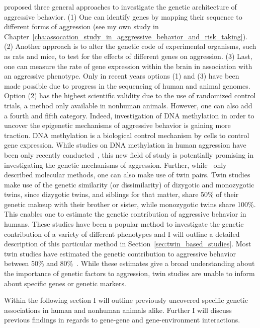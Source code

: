 \citet{Maxson2005} proposed three general approaches to investigate the genetic architecture of aggressive behavior.
(1) One can identify genes by mapping their sequence to different forms of aggression (see my own study in Chapter~\ref{cha:assocation_study_in_agggressive_behavior_and_risk_taking}).
(2) Another approach is to alter the genetic code of experimental organisms, such as rats and mice, to test for the effects of different genes on aggression.
(3) Last, one can measure the rate of gene expression within the brain in association with an aggressive phenotype.
Only in recent years options (1) and (3) have been made possible due to progress in the sequencing of human and animal genomes.
Option (2) has the highest scientific validity due to the use of randomized control trials, a method only available in nonhuman animals.
However, one can also add a fourth and fifth category.
Indeed, investigation of DNA methylation in order to uncover the epigenetic mechanisms of aggressive behavior is gaining more traction.
DNA methylation is a biological control mechanism by cells to control gene expression.
While studies on DNA methylation in human aggression have been only recently  conducted~\cite{VanDongen2015a}, this new field of study is potentially promising in investigating the genetic mechanisms of aggression.
Further, while~\citet{Maxson2005} only described molecular methods, one can also make use of twin pairs.
Twin studies make use of the genetic similarity (or dissimilarity) of dizygotic and monozygotic twins, since dizygotic twins, and siblings for that matter, share 50\% of their genetic makeup with their brother or sister, while monozygotic twins share 100\%.
This enables one to estimate the genetic contribution of aggressive behavior in humans.
These studies have been a popular method to investigate the genetic contribution of a variety of different phenotypes and I will outline a detailed description of this particular method in Section~\ref{sec:twin_based_studies}. 
Most twin studies have estimated the genetic contribution to aggressive behavior between 50\% and 80\%~\cite{Porsch2016}.
While these estimates give a broad understanding about the importance of genetic factors  to aggression, twin studies are unable to inform about specific genes or genetic markers.

Within the following section I will outline previously uncovered specific genetic associations in human and nonhuman animals alike.
Further I will discuss previous findings in regards to gene-gene and gene-environment interactions.

